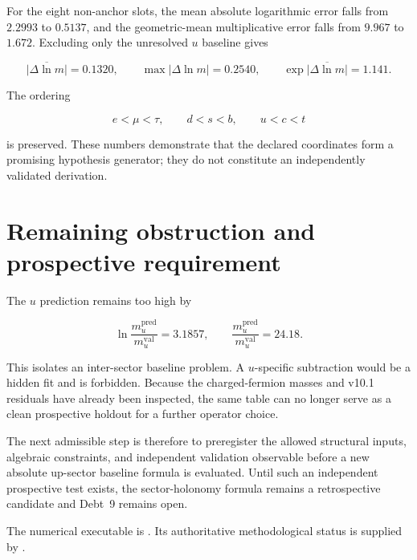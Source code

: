 For the eight non-anchor slots, the mean absolute logarithmic error falls from
$2.2993$ to $0.5137$, and the geometric-mean multiplicative error falls from
$9.967$ to $1.672$.  Excluding only the unresolved $u$ baseline gives

\[
\overline{|\Delta\ln m|}=0.1320,
\qquad
\max|\Delta\ln m|=0.2540,
\qquad
\exp\overline{|\Delta\ln m|}=1.141.
\]

The ordering

\[
e<\mu<\tau,
\qquad
d<s<b,
\qquad u<c<t
\]

is preserved.  These numbers demonstrate that the declared coordinates form a
promising hypothesis generator; they do not constitute an independently
validated derivation.

\section{Remaining obstruction and prospective requirement}

The $u$ prediction remains too high by

\[
\ln\frac{m_u^{\mathrm{pred}}}{m_u^{\mathrm{val}}}=3.1857,
\qquad
\frac{m_u^{\mathrm{pred}}}{m_u^{\mathrm{val}}}=24.18.
\]

This isolates an inter-sector baseline problem.  A $u$-specific subtraction
would be a hidden fit and is forbidden.  Because the charged-fermion masses and
v10.1 residuals have already been inspected, the same table can no longer
serve as a clean prospective holdout for a further operator choice.

The next admissible step is therefore to preregister the allowed structural
inputs, algebraic constraints, and independent validation observable before a
new absolute up-sector baseline formula is evaluated.  Until such an
independent prospective test exists, the sector-holonomy formula remains a
retrospective candidate and Debt~9 remains open.

The numerical executable is
.
Its authoritative methodological status is supplied by
.
